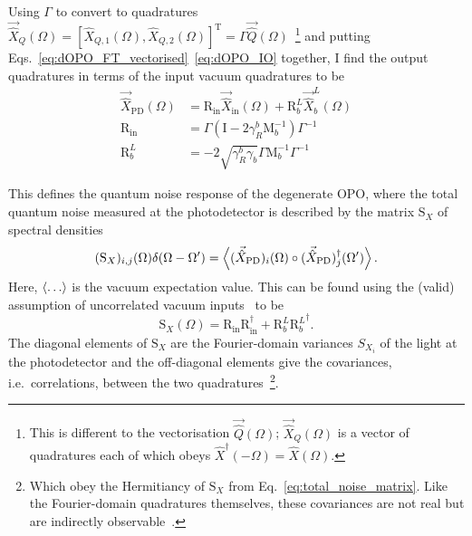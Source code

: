 Using $\Gamma$ to convert to quadratures $\vec{\hat{X}}_Q(\Omega)=[\hat{X}_{Q,1}(\Omega),\hat{X}_{Q,2}(\Omega)]^\text{T}=\Gamma \vec{\hat{Q}}(\Omega)$~\footnote{This is different to the vectorisation $\vec{\hat{Q}}(\Omega)$; $\vec{\hat{X}}_Q(\Omega)$ is a vector of quadratures each of which obeys $\hat{X}^\dag(-\Omega)=\hat{X}(\Omega)$.} and putting Eqs.~\ref{eq:dOPO_FT_vectorised}~\ref{eq:dOPO_IO} together, I find the output quadratures in terms of the input vacuum quadratures to be
\begin{align}
\label{eq:dOPO_PD_as_fn_of_vac}
\vec{\hat X}_\mathrm{PD}(\Omega)&=\text{R}_\text{in}\vec{\hat X}_\mathrm{in}(\Omega)+\text{R}^L_b\vec{\hat X}^L_b(\Omega)\\
\text{R}_\text{in}&=\Gamma\left(\text{I}-2\gamma^b_R\text{M}_b^{-1}\right)\Gamma^{-1}\\
\text{R}^L_b&=-2\sqrt{\gamma^b_R \gamma_b}\Gamma\text{M}_b^{-1}\Gamma^{-1}%
\end{align}

This defines the quantum noise response of the degenerate OPO, where the total quantum noise measured at the photodetector is described by the matrix $\text{S}_X$ of spectral densities 
\begin{equation}\label{eq:total_noise_matrix}
(\text{S}_X)_{i,j}(\Omega)\delta(\Omega-\Omega')=\ev{(\vec{\hat X}_\text{PD})_i(\Omega)\circ(\vec{\hat X}_\text{PD})_j^\dag(\Omega')}.
\end{equation}
Here, $\ev{\ldots}$ is the vacuum expectation value. This can be found using the (valid) assumption of uncorrelated vacuum inputs~\cite{} to be
\begin{equation}\label{eq:dOPO_Sx_abstract}
\text{S}_X(\Omega)=\text{R}_\text{in} \text{R}_\text{in}^\dag+\text{R}^L_b {\text{R}^L_b}^\dag. %
\end{equation}
The diagonal elements of $\text{S}_X$ are the Fourier-domain variances $S_{X_i}$ of the light at the photodetector and the off-diagonal elements give the covariances, i.e.\ correlations, between the two quadratures~\footnote{Which obey the Hermitiancy of $\text{S}_X$ from Eq.~\ref{eq:total_noise_matrix}. Like the Fourier-domain quadratures themselves, these covariances are not real but are indirectly observable~\cite{}.}.

